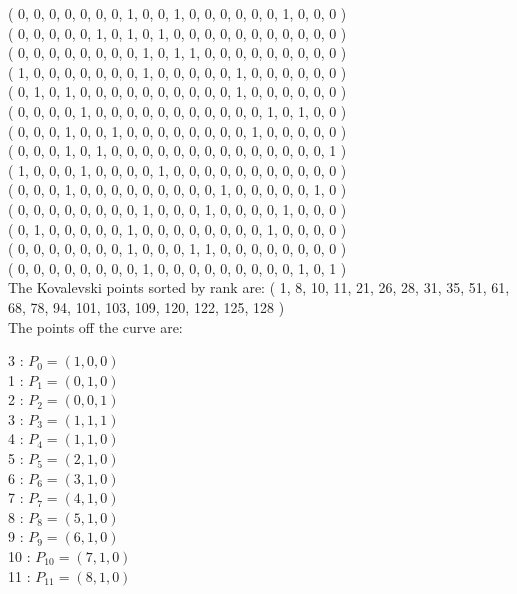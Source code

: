 \documentclass{article}
\begin{document}
{( 0, 0, 0, 0, 0, 0, 0, 1, 0, 0, 1, 0, 0, 0, 0, 0, 0, 1, 0, 0, 0 )\\
( 0, 0, 0, 0, 0, 1, 0, 1, 0, 1, 0, 0, 0, 0, 0, 0, 0, 0, 0, 0, 0 )\\
( 0, 0, 0, 0, 0, 0, 0, 0, 1, 0, 1, 1, 0, 0, 0, 0, 0, 0, 0, 0, 0 )\\
( 1, 0, 0, 0, 0, 0, 0, 0, 1, 0, 0, 0, 0, 0, 1, 0, 0, 0, 0, 0, 0 )\\
( 0, 1, 0, 1, 0, 0, 0, 0, 0, 0, 0, 0, 0, 0, 1, 0, 0, 0, 0, 0, 0 )\\
( 0, 0, 0, 0, 1, 0, 0, 0, 0, 0, 0, 0, 0, 0, 0, 0, 1, 0, 1, 0, 0 )\\
( 0, 0, 0, 1, 0, 0, 1, 0, 0, 0, 0, 0, 0, 0, 0, 1, 0, 0, 0, 0, 0 )\\
( 0, 0, 0, 1, 0, 1, 0, 0, 0, 0, 0, 0, 0, 0, 0, 0, 0, 0, 0, 0, 1 )\\
( 1, 0, 0, 0, 1, 0, 0, 0, 0, 1, 0, 0, 0, 0, 0, 0, 0, 0, 0, 0, 0 )\\
( 0, 0, 0, 1, 0, 0, 0, 0, 0, 0, 0, 0, 0, 1, 0, 0, 0, 0, 0, 1, 0 )\\
( 0, 0, 0, 0, 0, 0, 0, 0, 1, 0, 0, 0, 1, 0, 0, 0, 0, 1, 0, 0, 0 )\\
( 0, 1, 0, 0, 0, 0, 0, 1, 0, 0, 0, 0, 0, 0, 0, 0, 1, 0, 0, 0, 0 )\\
( 0, 0, 0, 0, 0, 0, 0, 1, 0, 0, 0, 1, 1, 0, 0, 0, 0, 0, 0, 0, 0 )\\
( 0, 0, 0, 0, 0, 0, 0, 0, 1, 0, 0, 0, 0, 0, 0, 0, 0, 0, 1, 0, 1 )\\
The Kovalevski points sorted by rank are: 
( 1, 8, 10, 11, 21, 26, 28, 31, 35, 51, 61, 68, 78, 94, 101, 103, 109, 120, 122, 125, 128 )\\
The points off the curve are: \\
\begin{multicols}{3}
 : $P_{0}=( 1, 0, 0 )$\\
1 : $P_{1}=( 0, 1, 0 )$\\
2 : $P_{2}=( 0, 0, 1 )$\\
3 : $P_{3}=( 1, 1, 1 )$\\
4 : $P_{4}=( 1, 1, 0 )$\\
5 : $P_{5}=( 2, 1, 0 )$\\
6 : $P_{6}=( 3, 1, 0 )$\\
7 : $P_{7}=( 4, 1, 0 )$\\
8 : $P_{8}=( 5, 1, 0 )$\\
9 : $P_{9}=( 6, 1, 0 )$\\
10 : $P_{10}=( 7, 1, 0 )$\\
11 : $P_{11}=( 8, 1, 0 )$\\

\end{multicols}}
\end{document}
